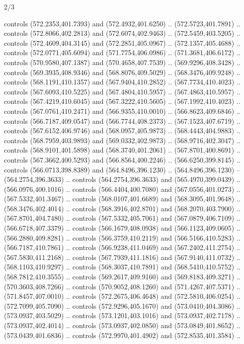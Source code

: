 \begin{flagdescription}{2/3}
\begin{scope}[xshift=0.5\flaglength,yshift=0.5\flagwidth,scale=\flagwidth/495.65]
\begin{scope}[y=0.8pt, x=0.8pt, yscale=-1,shift={(-463.76,-309.78)}]
  controls (572.2353,401.7393) and (572.4932,401.6250) .. (572.5723,401.7891) ..
  controls (572.8066,402.2813) and (572.6074,402.9463) .. (572.5459,403.5205) ..
  controls (572.4609,404.3145) and (572.2851,405.0967) .. (572.1357,405.4688) ..
  controls (572.0771,405.6094) and (571.7754,406.0986) .. (571.3681,406.6172) ..
  controls (570.9580,407.1387) and (570.4658,407.7539) .. (569.9296,408.3428) ..
  controls (569.3935,408.9346) and (568.8076,409.5029) .. (568.3476,409.9248) ..
  controls (568.1191,410.1357) and (567.9404,410.2852) .. (567.7734,410.4023) ..
  controls (567.6093,410.5225) and (567.4804,410.5957) .. (567.4863,410.5957) ..
  controls (567.4219,410.6045) and (567.3222,410.5605) .. (567.1992,410.4023) ..
  controls (567.0761,410.2471) and (566.9355,410.0010) .. (566.8623,409.6846) ..
  controls (566.7187,409.0547) and (566.7744,408.2373) .. (567.1523,407.6719) ..
  controls (567.6152,406.9746) and (568.0957,405.9873) .. (568.4443,404.9883) ..
  controls (568.7959,403.9893) and (569.0332,402.9873) .. (568.9716,402.3047) ..
  controls (568.9101,401.5898) and (568.3740,401.2061) .. (567.8701,400.8691) ..
  controls (567.3662,400.5293) and (566.8564,400.2246) .. (566.6250,399.8145) ..
  controls (566.0713,398.8389) and (564.8496,396.1230) .. (564.8496,396.1230) --
  (564.2754,396.3633) .. controls (564.2754,396.3633) and (565.4970,399.0439) ..
  (566.0976,400.1016) .. controls (566.4404,400.7080) and (567.0556,401.0273) ..
  (567.5332,401.3467) .. controls (568.0107,401.6689) and (568.3095,401.9648) ..
  (568.3476,402.4014) .. controls (568.3916,402.8701) and (568.2070,403.7900) ..
  (567.8701,404.7480) .. controls (567.5332,405.7061) and (567.0879,406.7109) ..
  (566.6718,407.3379) .. controls (566.1679,408.0938) and (566.1123,409.0605) ..
  (566.2880,409.8281) .. controls (566.3759,410.2119) and (566.5166,410.5283) ..
  (566.7187,410.7861) .. controls (566.9238,411.0469) and (567.2402,411.2754) ..
  (567.5830,411.2168) .. controls (567.7939,411.1816) and (567.9140,411.0732) ..
  (568.1103,410.9297) .. controls (568.3037,410.7891) and (568.5410,410.5752) ..
  (568.7812,410.3555) .. controls (569.2617,409.9160) and (569.8183,409.3271) ..
  (570.3603,408.7266) .. controls (570.9052,408.1260) and (571.4267,407.5371) ..
  (571.8457,407.0010) .. controls (572.2675,406.4648) and (572.5810,406.0254) ..
  (572.7099,405.7090) .. controls (572.9296,405.1670) and (573.0410,404.3086) ..
  (573.0937,403.5029) .. controls (573.1201,403.1016) and (573.0937,402.7178) ..
  (573.0937,402.4014) .. controls (573.0937,402.0850) and (573.0849,401.8652) ..
  (573.0439,401.6836) .. controls (572.9970,401.4902) and (572.8535,401.3584) ..

\end{scope}
\end{scope}
\end{flagdescription}
